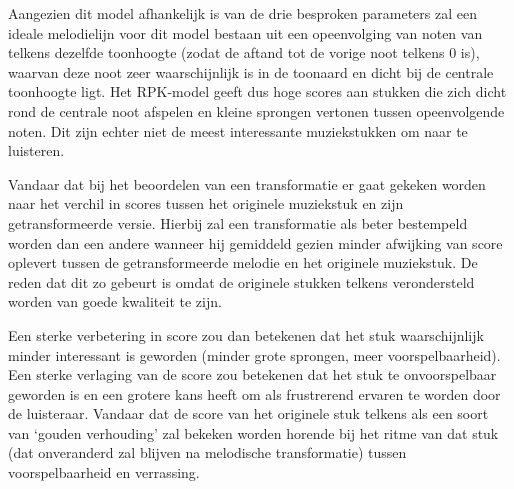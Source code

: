 Aangezien dit model afhankelijk is van de drie besproken parameters zal een ideale melodielijn voor dit model bestaan uit een opeenvolging van noten van telkens dezelfde toonhoogte (zodat de aftand tot de vorige noot telkens 0 is), waarvan deze noot zeer waarschijnlijk is in de toonaard en dicht bij de centrale toonhoogte ligt. Het RPK-model geeft dus hoge scores aan stukken die zich dicht rond de centrale noot afspelen en kleine sprongen vertonen tussen opeenvolgende noten. Dit zijn echter niet de meest interessante muziekstukken om naar te luisteren. 

Vandaar dat bij het beoordelen van een transformatie er gaat gekeken worden naar het verchil in scores tussen het originele muziekstuk en zijn getransformeerde versie. Hierbij zal een transformatie als beter bestempeld worden dan een andere wanneer hij gemiddeld gezien minder afwijking van score oplevert tussen de getransformeerde melodie en het originele muziekstuk. De reden dat dit zo gebeurt is omdat de originele stukken telkens verondersteld worden van goede kwaliteit te zijn. 

Een sterke verbetering in score zou dan betekenen dat het stuk waarschijnlijk minder interessant is geworden (minder grote sprongen, meer voorspelbaarheid). Een sterke verlaging van de score zou betekenen dat het stuk te onvoorspelbaar geworden is en een grotere kans heeft om als frustrerend ervaren te worden door de luisteraar. Vandaar dat de score van het originele stuk telkens als een soort van `gouden verhouding' zal bekeken worden horende bij het ritme van dat stuk (dat onveranderd zal blijven na melodische transformatie) tussen voorspelbaarheid en verrassing.  

